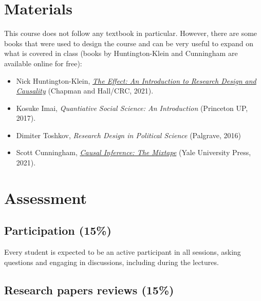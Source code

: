 \documentclass[12pt, a4paper]{article}
\begin{document}
\section{Materials}

This course does not follow any textbook in particular.
However, there are some books that were used to design the course and can be very useful to expand on what is covered in class (books by Huntington-Klein and Cunningham are available online for free):

\begin{itemize}
\setlength\itemsep{-5pt}
  \item Nick Huntington-Klein, \href{https://theeffectbook.net/}{\textit{The Effect: An Introduction to Research Design and Causality}} (Chapman and Hall/CRC, 2021).
  \item Kosuke Imai, \textit{Quantiative Social Science: An Introduction} (Princeton UP, 2017).
  \item Dimiter Toshkov, \textit{Research Design in Political Science} (Palgrave, 2016)
  \item Scott Cunningham, \href{https://mixtape.scunning.com/}{\textit{Causal Inference: The Mixtape}} (Yale University Press, 2021).
\end{itemize}


\section{Assessment}


\subsection*{Participation (15\%)}

Every student is expected to be an active participant in all sessions, asking questions and engaging in discussions, including during the lectures.

\subsection*{Research papers reviews (15\%)}
\end{document}

